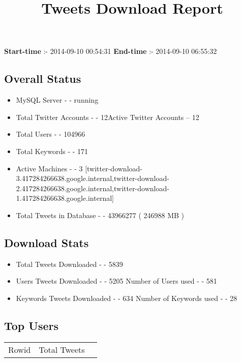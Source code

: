 \documentclass{article}\usepackage[T1]{fontenc}
\begin{document}
\title{\textbf{Tweets Download Report}}
               \date{}
                \maketitle
               \centerline{\textbf{Start-time} :- 2014-09-10 00:54:31 \hspace{40pt} \textbf{End-time} :- 2014-09-10 06:55:32}               \subsection*{Overall Status}                \begin{itemize}                \item MySQL Server - - running               \item Total Twitter Accounts - - 12\newline Active Twitter Accounts -- 12               \item Total Users - - 104966               \item Total Keywords - - 171               \item Active Machines - - 3 [twitter-download-3.417284266638.google.internal,twitter-download-2.417284266638.google.internal,twitter-download-1.417284266638.google.internal]               \item Total Tweets in Database - - 43966277 ( 246988 MB )               \end{itemize}               \subsection*{Download Stats}                \begin{itemize}                \item Total Tweets Downloaded - - 5839               \item Users Tweets Downloaded - - 5205 \newline Number of Users used - - 581               \item Keywords Tweets Downloaded - - 634 \newline Number of Keywords used - - 28              \end{itemize}              \subsection*{Top Users}\begin{tabular}{|c|c|c|}         \hline         Rowid & Total Tweets \\ 

\end{tabular}
\end{document}
